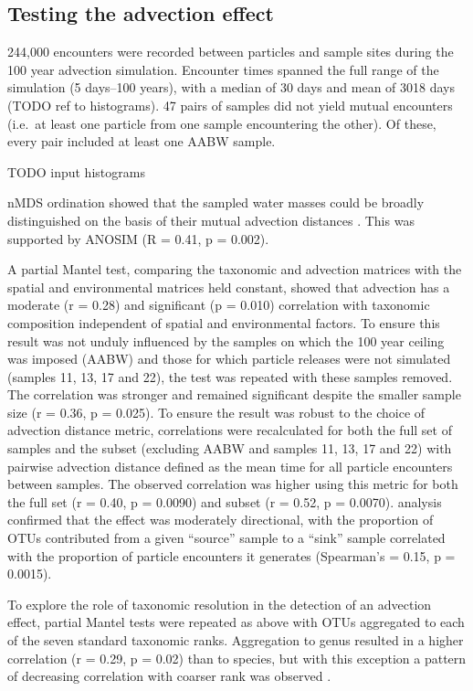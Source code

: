 \subsection{Testing the advection effect}

244,000 encounters were recorded between particles and sample sites during the 100 year advection simulation.
Encounter times spanned the full range of the simulation (5 days--100 years), with a median of 30 days and mean of 3018 days (TODO ref to histograms).
47 pairs of samples did not yield mutual encounters (i.e.\ at least one particle from one sample encountering the other).
Of these, every pair included at least one AABW sample.

TODO input histograms

\ac{nMDS} ordination showed that the sampled water masses could be broadly distinguished on the basis of their mutual advection distances .
This was supported by \ac{ANOSIM} (R = 0.41, p = 0.002).



A partial Mantel test, comparing the taxonomic and advection matrices with the spatial and environmental matrices held constant, showed that advection has a moderate (r = 0.28) and significant (p = 0.010) correlation with taxonomic composition independent of spatial and environmental factors.
To ensure this result was not unduly influenced by the samples on which the 100 year ceiling was imposed (\ac{AABW}) and those for which particle releases were not simulated (samples 11, 13, 17 and 22), the test was repeated with these samples removed.
The correlation was stronger and remained significant despite the smaller sample size (r = 0.36, p = 0.025).
To ensure the result was robust to the choice of advection distance metric, correlations were recalculated for both the full set of samples and the subset (excluding \ac{AABW} and samples 11, 13, 17 and 22) with pairwise advection distance defined as the mean time for all particle encounters between samples.
The observed correlation was higher using this metric for both the full set (r = 0.40, p = 0.0090) and subset (r = 0.52, p = 0.0070).
 analysis confirmed that the effect was moderately directional, with the proportion of \acp{OTU} contributed from a given ``source'' sample to a ``sink'' sample correlated with the proportion of particle encounters it generates (Spearman's \textrho{} = 0.15, p = 0.0015). 

To explore the role of taxonomic resolution in the detection of an advection effect, partial Mantel tests were repeated as above with \acp{OTU} aggregated to each of the seven standard taxonomic ranks.
Aggregation to genus resulted in a higher correlation (r = 0.29, p = 0.02) than to species, but with this exception a pattern of decreasing correlation with coarser rank was observed .


